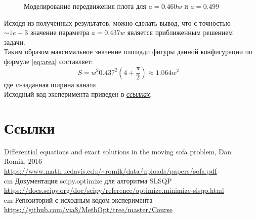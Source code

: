 \documentclass[12pt,a4paper]{article}
\begin{document}
		\begin{figure}[H]
			\centering
			\caption{Моделирование передвижения плота для $a = 0.460w$ и $a = 0.499$}
		\end{figure}
	
	Исходя из полученных результатов, можно сделать вывод, что с точностью $\sim1e-3$ значение параметра $a=0.437w$ является приближенным решением задачи.\\
	
	Таким образом максимальное значение площади фигуры данной конфигурации по формуле \eqref{eq:area} составляет: 
	\begin{equation}\label{eq:result}
		S = w^2 0.437^2 (4 + \frac{\pi}{2}) \approx 1.064w^2
	\end{equation}
	где $w$-заданная ширина канала\\
	
	\noindent Исходный код эксперимента приведен в \hyperref[sec:references]{\textit{ссылках}}.
	
	\newpage
	
	\section{Ссылки}\label{sec:references}
		\noindent [1]\label{1} Differential equations and exact solutions in the
		moving sofa problem, Dan Romik, 2016\\ {\url{https://www.math.ucdavis.edu/~romik/data/uploads/papers/sofa.pdf}}\\
		 cm
		\noindent [2]\label{2} Документация scipy.optimize для алгоритма SLSQP\\
		{\url{https://docs.scipy.org/doc/scipy/reference/optimize.minimize-slsqp.html}}\\
		 cm
		\noindent [3]\label{3} Репозиторий с исходным кодом эксперимента\\
		{\url{https://github.com/via8/MethOpt/tree/master/Course}}
\end{document}
